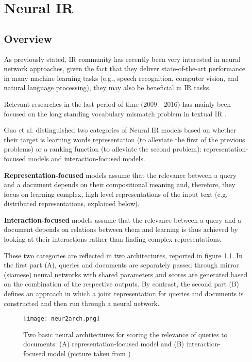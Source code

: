 \newpage
\chapter{Neural IR}
\label{chap:neurIR}

\section{Overview}

As previously stated, IR community has recently been very interested in neural network approaches, given the fact that they deliver state-of-the-art performance in many machine learning tasks (e.g., speech recognition, computer vision, and natural language processing), they may also be beneficial in IR tasks.

Relevant researches in the last period of time (2009 - 2016) has mainly been focused on the long standing vocabulary mismatch problem in textual IR \cite{neurIRearly}.

Guo et al. distinguished two categories of Neural IR models \cite{deeplookneurir} based on whether their target is learning words representation (to alleviate the first of the previous problems) or a ranking function (to alleviate the second problem): representation-focused models and interaction-focused models.

\textbf{Representation-focused} models assume that the relevance between a query and a document depends on their compositional meaning and, therefore, they focus on learning complex, high level representations of the input text (e.g. distributed representations, explained below).

\textbf{Interaction-focused} models assume that the relevance between a query and a document depends on relations between them and learning is thus achieved by looking at their interactions rather than finding complex representations.

These two categories are reflected in two architectures, reported in figure \ref{fig:neur2arch}. In the first part (A), queries and documents are separately passed through mirror (siamese) neural networks with shared parameters and scores are generated based on the combination of the respective outputs. By contrast, the second part (B) defines an approach in which a joint representation for queries and documents is constructed and then run through a neural network.

\begin{figure}
  \centering
  \texttt{[image: neur2arch.png]}
  \caption{Two basic neural architectures for scoring the relevance of queries to documents: (A) representation-focused model and (B) interaction-focused model (picture taken from \cite{neurIRearly})}
  \label{fig:neur2arch}
\end{figure}

